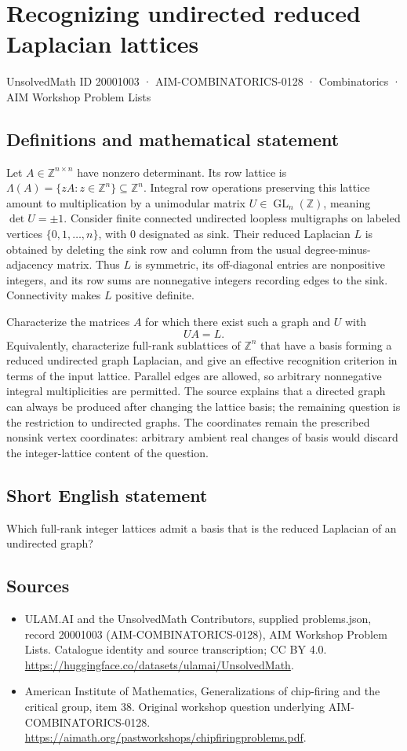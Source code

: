 \documentclass[11pt,a4paper]{article}
\begin{document}
\section*{Recognizing undirected reduced Laplacian lattices}\label{20001003}
{\small UnsolvedMath ID 20001003 · AIM-COMBINATORICS-0128 · Combinatorics · AIM Workshop Problem Lists}
\subsection{Definitions and mathematical statement}
Let $A\in\mathbb Z^{n\times n}$ have nonzero determinant.
Its row lattice is $\Lambda(A)=\{zA:z\in\mathbb Z^n\}\subseteq\mathbb Z^n$.
Integral row operations preserving this lattice amount to multiplication by a unimodular matrix $U\in\operatorname{GL}_n(\mathbb Z)$, meaning $\det U=\pm1$.
Consider finite connected undirected loopless multigraphs on labeled vertices $\{0,1,\ldots,n\}$, with $0$ designated as sink.
Their reduced Laplacian $L$ is obtained by deleting the sink row and column from the usual degree-minus-adjacency matrix.
Thus $L$ is symmetric, its off-diagonal entries are nonpositive integers, and its row sums are nonnegative integers recording edges to the sink.
Connectivity makes $L$ positive definite.

Characterize the matrices $A$ for which there exist such a graph and $U$ with
\[
 UA=L.
\]
Equivalently, characterize full-rank sublattices of $\mathbb Z^n$ that have a basis forming a reduced undirected graph Laplacian, and give an effective recognition criterion in terms of the input lattice.
Parallel edges are allowed, so arbitrary nonnegative integral multiplicities are permitted.
The source explains that a directed graph can always be produced after changing the lattice basis; the remaining question is the restriction to undirected graphs.
The coordinates remain the prescribed nonsink vertex coordinates: arbitrary ambient real changes of basis would discard the integer-lattice content of the question.
\subsection{Short English statement}
Which full-rank integer lattices admit a basis that is the reduced Laplacian of an undirected graph?
\subsection{Sources}
\begin{itemize}
\item[S1] ULAM.AI and the UnsolvedMath Contributors, supplied problems.json, record 20001003 (AIM-COMBINATORICS-0128), AIM Workshop Problem Lists. Catalogue identity and source transcription; CC BY 4.0.
\url{https://huggingface.co/datasets/ulamai/UnsolvedMath}.
\item[S2] American Institute of Mathematics, Generalizations of chip-firing and the critical group, item 38. Original workshop question underlying AIM-COMBINATORICS-0128.
\url{https://aimath.org/pastworkshops/chipfiringproblems.pdf}.
\end{itemize}
\end{document}
